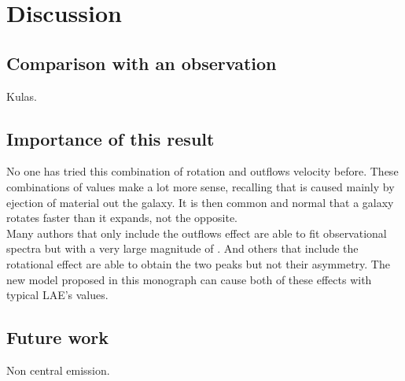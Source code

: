 \setcounter{equation}{0}
\chapter{Discussion}

\section{Comparison with an observation}

Kulas.\\


\section{Importance of this result}

No one has tried this combination of rotation and outflows velocity before. These combinations of values make a lot more sense, recalling that \vout is caused mainly by ejection of material out the galaxy. It is then common and normal that a galaxy rotates faster than it expands, not the opposite. \\

Many authors that only include the outflows effect are able to fit observational spectra but with a very large magnitude of \vout. And others that include the rotational effect are able to obtain the two peaks but not their asymmetry. The new model proposed in this monograph can cause both of these effects with typical LAE's values.\\


\section{Future work}

Non central emission. \\